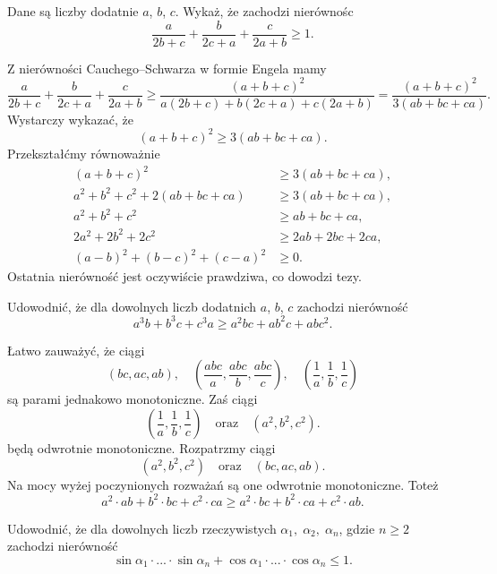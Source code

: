 \newpage
{}


\begin{problem}{1}
	Dane są liczby dodatnie $a$, $b$, $c$. Wykaż, że zachodzi nierównośc
	\[
		\frac{a}{2b + c} + \frac{b}{2c + a} + \frac{c}{2a + b} \geqslant 1. 
	\]
\end{problem}

\noindent
Z nierówności Cauchego–Schwarza w formie Engela mamy
\[
	\frac{a}{2b + c} + \frac{b}{2c + a} + \frac{c}{2a + b} \geqslant \frac{(a + b + c)^2}{a(2b + c) + b(2c + a) + c(2a + b)} = \frac{(a + b + c)^2}{3(ab + bc + ca)}.
\]
Wystarczy wykazać, że
\[
	(a + b + c)^2 \geqslant 3(ab + bc + ca).
\]
Przekształćmy równoważnie
\begin{align*}
	(a + b + c)^2 &\geqslant 3(ab + bc + ca), \\ 
	a^2 + b^2 + c^2 + 2(ab + bc + ca) &\geqslant 3(ab + bc + ca), \\
	a^2 + b^2 + c^2 &\geqslant ab + bc + ca, \\
	2a^2 + 2b^2 + 2c^2 &\geqslant 2ab + 2bc + 2ca, \\
	(a - b)^2 + (b - c)^2 + (c - a)^2 &\geqslant 0.
\end{align*}
Ostatnia nierówność jest oczywiście prawdziwa, co dowodzi tezy.

\begin{problem}{2}
	Udowodnić, że dla dowolnych liczb dodatnich $a$, $b$, $c$ zachodzi nierówność
	\[
		a^3b + b^3c + c^3a \geqslant a^2bc + ab^2c + abc^2.
	\]
\end{problem}

\noindent
Łatwo zauważyć, że ciągi
\[
	(bc, ac, ab), \quad \left(\frac{abc}{a}, \frac{abc}{b}, \frac{abc}{c}\right), \quad \left(\frac{1}{a}, \frac{1}{b}, \frac{1}{c}\right)
\]
są parami jednakowo monotoniczne. Zaś ciągi
\[
	\left(\frac{1}{a}, \frac{1}{b}, \frac{1}{c}\right) \quad \text{oraz} \quad (a^2, b^2, c^2).
\]
będą odwrotnie monotoniczne.
Rozpatrzmy ciągi
\[
	(a^2, b^2, c^2) \quad \text{oraz} \quad (bc, ac, ab).
\]
Na mocy wyżej poczynionych rozważań są one odwrotnie monotoniczne. Toteż
\[
	a^2 \cdot ab  + b^2 \cdot bc  + c^2 \cdot ca  \geqslant a^2 \cdot bc  + b^2 \cdot ca  + c^2 \cdot ab.
\]

\begin{problem}{3}
	Udowodnić, że dla dowolnych liczb rzeczywistych $\alpha_1, \; \alpha_2, \; \alpha_n$, gdzie $n \geqslant 2$ zachodzi nierówność
	\[
		\sin{\alpha_1}\cdot ... \cdot \sin{\alpha_n} + \cos{\alpha_1}\cdot ... \cdot \cos{\alpha_n} \leqslant 1.
	\]
\end{problem}

